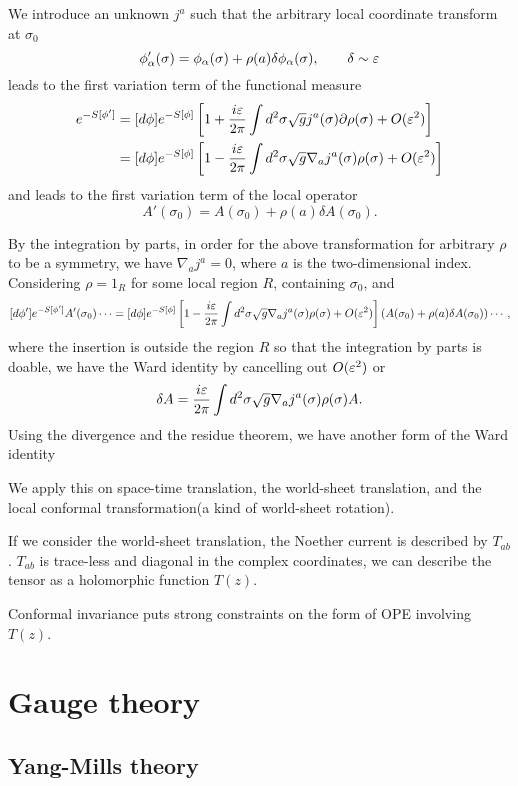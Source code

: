 \documentclass{../../large}
\begin{document}
\begin{prb}
We introduce an unknown $j^a$ such that the arbitrary local coordinate transform at $\sigma_0$
\[\phi'_\alpha(\sigma)=\phi_\alpha(\sigma)+\rho(a)\delta\phi_\alpha(\sigma),\qquad \delta\sim\varepsilon\]
leads to the first variation term of the functional measure
\begin{align*}
[d\phi']e^{-S[\phi']}
&=[d\phi]e^{-S[\phi]}\left[1+\frac{i\e}{2\pi}\int d^2\sigma\sqrt gj^a(\sigma)\partial\rho(\sigma)+O(\e^2)\right]\\
&=[d\phi]e^{-S[\phi]}\left[1-\frac{i\e}{2\pi}\int d^2\sigma\sqrt g\nabla_aj^a(\sigma)\rho(\sigma)+O(\e^2)\right]
\end{align*}
and
leads to the first variation term of the local operator
\[A'(\sigma_0)=A(\sigma_0)+\rho(a)\delta A(\sigma_0).\]

By the integration by parts, in order for the above transformation for arbitrary $\rho$ to be a symmetry, we have $\nabla_aj^a=0$, where $a$ is the two-dimensional index.
Considering $\rho=1_R$ for some local region $R$, containing $\sigma_0$, and
\[[d\phi']e^{-S[\phi']}A'(\sigma_0)\cdots=[d\phi]e^{-S[\phi]}\left[1-\frac{i\varepsilon}{2\pi}\int d^2\sigma\sqrt g\nabla_aj^a(\sigma)\rho(\sigma)+O(\varepsilon^2)\right](A(\sigma_0)+\rho(a)\delta A(\sigma_0))\cdots,\]
where the insertion is outside the region $R$ so that the integration by parts is doable, we have the Ward identity by cancelling out $O(\varepsilon^2)$ or 
\[\delta A=\frac{i\varepsilon}{2\pi}\int d^2\sigma\sqrt g\nabla_aj^a(\sigma)\rho(\sigma)A.\]
Using the divergence and the residue theorem, we have another form of the Ward identity
\[\]

We apply this on space-time translation, the world-sheet translation, and the local conformal transformation(a kind of world-sheet rotation).

\end{prb}

If we consider the world-sheet translation, the Noether current is described by $T_{ab}$.
$T_{ab}$ is trace-less and diagonal in the complex coordinates, we can describe the tensor as a holomorphic function $T(z)$.

Conformal invariance puts strong constraints on the form of OPE involving $T(z)$.


\part{Gauge theory}

\chapter{Yang-Mills theory}
\end{document}

